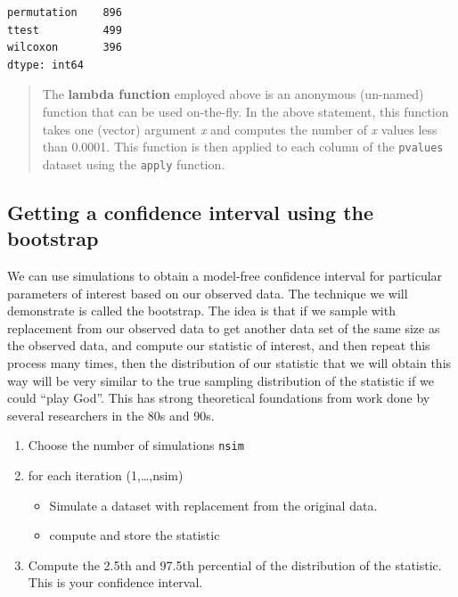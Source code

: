 \documentclass[
  letterpaper,
]{scrbook}
\providecommand{\tightlist}{%
  \setlength{\itemsep}{0pt}\setlength{\parskip}{0pt}}
\begin{document}
\begin{verbatim}
permutation    896
ttest          499
wilcoxon       396
dtype: int64
\end{verbatim}

\begin{quote}
The \textbf{lambda function} employed above is an anonymous (un-named) function that
can be used on-the-fly. In the above statement, this function takes one (vector) argument \emph{x} and computes the number of \emph{x} values less than 0.0001. This function is then applied to each column of the \texttt{pvalues} dataset using the \texttt{apply} function.
\end{quote}

\hypertarget{getting-a-confidence-interval-using-the-bootstrap}{%
\subsection{Getting a confidence interval using the bootstrap}\label{getting-a-confidence-interval-using-the-bootstrap}}

We can use simulations to obtain a model-free confidence interval for particular parameters of interest based on our observed data. The technique we will demonstrate is called the bootstrap. The idea is that if we sample with replacement from our observed data to get another data set of the same size as the observed data, and compute our statistic of interest, and then repeat this process many times, then the distribution of our statistic that we will obtain this way will be very similar to the true sampling distribution of the statistic if we could ``play God''. This has strong theoretical foundations from work done by several researchers in the 80s and 90s.

\begin{enumerate}
\def\labelenumi{\arabic{enumi}.}
\tightlist
\item
  Choose the number of simulations \texttt{nsim}
\item
  for each iteration (1,\ldots,nsim)

  \begin{itemize}
  \tightlist
  \item
    Simulate a dataset with replacement from the original data.
  \item
    compute and store the statistic
  \end{itemize}
\item
  Compute the 2.5th and 97.5th percential of the distribution of the statistic. This is your confidence interval.
\end{enumerate}
\end{document}
